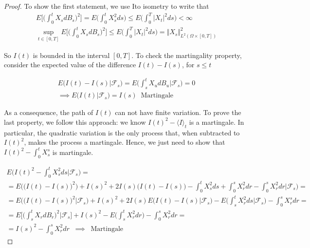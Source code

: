 \begin{proof}
    To show the first statement, we use Ito isometry to write that
    \begin{gather*}
        E\Bigg[ \Bigg( \int_0^t X_s dB_s \Bigg)^2 \Bigg] = E\Bigg( \int_0^t X_s^2 ds \Bigg) \leq E\Bigg( \int_0^T \vert X_t \vert^2 ds \Bigg) < \infty \\
        \sup_{t \in [0,T]} E\Bigg[ \Bigg( \int_0^t X_s dB_s \Bigg)^2\Bigg] \leq E\Bigg( \int_0^T \vert X_t \vert^2 ds \Bigg) = \Vert X_s \Vert_{L^2(\Omega \times [0,T])}^2
    \end{gather*}

    So $I(t)$ is bounded in the interval $[0,T]$. To check the martingality property, consider the expected value of the difference $I(t)-I(s)$, for $s \leq t$

    \begin{gather*}
        E\Big( I(t)-I(s) \Big\vert \mathcal{F}_s \Big) = E\Bigg( \int_s^t X_u dB_u \Big\vert \mathcal{F}_s \Bigg) = 0 \\
        \implies E\big( I(t) \vert \mathcal{F}_s \big) = I(s) \;\; \text{Martingale}
    \end{gather*}

    As a consequence, the path of $I(t)$ can not have finite variation.
    To prove the last property, we follow this approach: we know $I(t)^2 - \langle I \rangle_t$ is a martingale. In particular, the quadratic variation is the only process that, when subtracted to $I(t)^2$, makes the process a martingale. Hence, we just need to show that $I(t)^2-\int_0^t X_s^s$ is martingale.

    \begin{gather*}
        E\Bigg( I(t)^2 - \int_0^t X_s^2 ds \Bigg\vert \mathcal{F}_s \Bigg) =\\
        = E\Bigg( \big( I(t) - I(s) \big)^2 \Big)+I(s)^2 + 2I(s)\big( I(t)-I(s) \big) - \int_0^t X_s^2 ds + \int_0^s X_r^2 dr - \int_0^s X_r^2 dr \Bigg\vert \mathcal{F}_s \Bigg) = \\
        = E\Big( \big(I(t)-I(s)\big)^2 \big\vert \mathcal{F}_s \Big) + I(s)^2+2I(s)E\Big( I(t)-I(s) \vert \mathcal{F}_s \Big) - E\Bigg( \int_s^t X_r^2 ds \Big\vert \mathcal{F}_s \Bigg) - \int_0^s X_r^s dr = \\
        = E\Bigg[ \Bigg( \int_s^t X_r dB_r \Bigg)^2 \Bigg\vert \mathcal{F}_s \Bigg] + I(s)^2 - E\Bigg( \int_s^t X_r^2 dr \Bigg) - \int_0^s X_r^2 dr = \\
        = I(s)^2 - \int_0^s X_r^2 dr \;\; \implies \;\; \text{Martingale}
    \end{gather*}
\end{proof}

